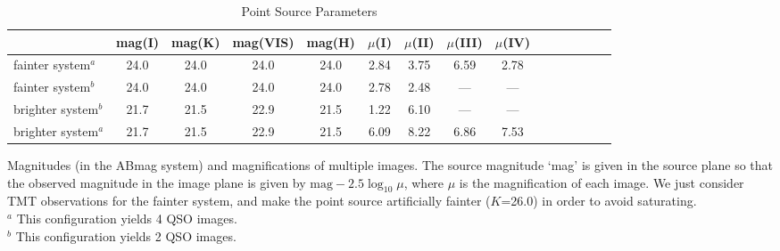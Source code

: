 \documentclass[a4paper,11pt]{article}
\begin{document}
{%
\begin{table}\footnotesize
\begin{center}
\caption{Point Source Parameters}
\begin{tabular}{lcccccccccccccc|}
\hline \hline
&  mag(I) &  mag(K) &  mag(VIS) & mag(H) & $\mu$(I) & $\mu$(II) & $\mu$(III) & $\mu$(IV) \\
\hline
fainter system$^a$   &24.0  &   24.0 &  24.0 &  24.0 &  2.84 &  3.75 & 6.59 & 2.78  \\
fainter system$^b$   &24.0  &  24.0  &  24.0 &  24.0 &  2.78 &  2.48 &  ---   &  ---\\
brighter system$^b$ &21.7  &  21.5 &  22.9  & 21.5  & 1.22  & 6.10  & ---   &  ---\\
brighter system$^a$ &21.7  &  21.5 & 22.9  &  21.5  & 6.09  & 8.22 & 6.86  & 7.53\\
\hline
\hline
\end{tabular}
\begin{tablenotes}
\item
Magnitudes (in the ABmag system) and magnifications of multiple images.
 The source magnitude `mag' is given in the source plane so that the observed magnitude in the image plane is given by
  $\mathrm{mag}-2.5\log_{10} \mu$, where $\mu$ is the magnification of each image. We just consider TMT observations for the fainter system, and make the point source artificially fainter ($K$=26.0) in order to avoid saturating.\\
$^a$ This configuration yields 4 QSO images. \\
$^b$ This configuration yields 2 QSO images. \\
\label{tab:pointsource}
\end{tablenotes}
\end{center}
\end{table}

}
\end{document}
